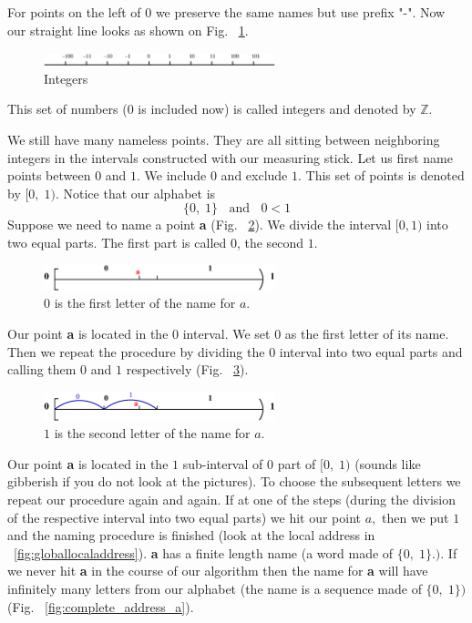 \documentclass[color=black,11pt]{elegantpaper}
\begin{document}
For points on the left of $0$ we preserve the same names but use prefix "-". Now our straight line looks as shown on Fig. ~\ref{fig:line_with_integers}.
\begin{figure}[htbp]
  \centering
  \includegraphics[width=0.6\textwidth]{xfig_stuff/Line_with_integers.eps}
  \caption{Integers}
  \label{fig:line_with_integers}
\end{figure}
This set of numbers ($0$ is included now) is called integers and denoted by $\mathbb{Z}.$

We still have many nameless points. They are all sitting between neighboring integers in the intervals constructed with our measuring stick.  Let us first name points between $0$ and $1.$ We include $0$ and exclude $1.$ This set of points is denoted by $[0,\;1).$
Notice that our alphabet is
$$
\{0,\;1\}\;\;\mbox{ and } \;\; 0 < 1
$$
Suppose we need to name a point {\bf \color{red}a} (Fig. ~\ref{fig:point_between_0_and_1}). We divide the interval $[0,1)$ into two equal parts. The first part is called $0$, the second $1.$
\begin{figure}[htbp]
  \centering
  \includegraphics[width=0.6\textwidth]{xfig_stuff/ZeroInterval.eps}
  \caption{$0$ is the first letter of the name for $a.$}
  \label{fig:point_between_0_and_1}
\end{figure}
Our point {\bf \color{red}a} is located in the $0$ interval. We set $0$ as the first letter of its name. Then we repeat the procedure by dividing the $0$ interval into two equal parts and calling them $0$ and $1$ respectively (Fig. ~\ref{fig:2nd_letter_choice}).
\begin{figure}[htbp]
  \centering
  \includegraphics[width=0.6\textwidth]{xfig_stuff/2ndLetterInTheName.eps}
  \caption{$1$ is the second letter of the name for $a.$}
  \label{fig:2nd_letter_choice}
\end{figure}
Our point {\bf \color{red}a} is located in the $1$ sub-interval of $0$ part of $[0,\;1)$ (sounds like gibberish if you do not look at the pictures). To choose the subsequent letters we repeat our procedure again and again. If at one of the steps (during the division of the respective interval into two equal parts) we hit our point $a,$ then we put $1$ and  the naming procedure is finished (look at the local address in ~\ref{fig:globallocaladdress}). {\bf \color{red}a} has a finite length name (a word made of $\{0,\;1\}.).$ If we never hit {\bf \color{red}a} in the course of our algorithm then the name for {\bf \color{red}a} will have infinitely many letters from our alphabet (the name is a sequence made of $\{0,\;1\})$ (Fig. ~\ref{fig:complete_address_a}).
\end{document}
